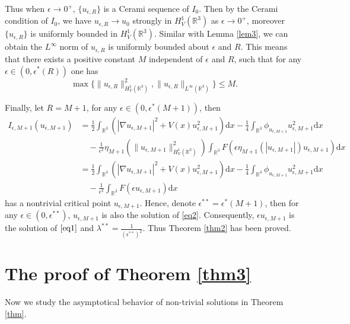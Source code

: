 \documentclass[12pt]{amsart}
\numberwithin{equation}{section}
\theoremstyle{definition}
\begin{document}
Thus when $\epsilon\to0^{+}$, $\{u_{\epsilon,R}\}$ is a Cerami sequence of $I_0$. Then by the Cerami condition of $I_0$, we have $u_{\epsilon,R}\to u_0$ strongly in $H^1_{V}(\mathbb{R}^3)$ as $\epsilon\to0^+$, moreover $\{u_{\epsilon,R}\}$ is uniformly bounded in $H^1_{V}(\mathbb{R}^3)$. Similar with Lemma \ref{lem3}, we can obtain the $L^{\infty}$ norm of $u_{\epsilon,R}$ is uniformly bounded about $\epsilon$ and $R$. This means that there exists a positive constant $M$ independent of $\epsilon$ and $R$, such that for any $\epsilon\in(0,\epsilon^{\ast}(R))$ one has
$$\max\{\|u_{\epsilon,R}\|^2_{H^1_{V}(\mathbb{R}^3)},\|u_{\epsilon,R}\|_{L^{\infty}(\mathbb{R}^3)}\}\leq M.$$

Finally, let $R=M+1$, for any $\epsilon\in(0,\epsilon^{\ast}(M+1))$, then
\begin{equation*}
\begin{split}
    I_{\epsilon,M+1}\left ( u_{\epsilon,M+1} \right )&=\frac{1}{2}\int_{\mathbb R^3}\left(|\nabla u_{\epsilon,M+1}|^2+V(x)u_{\epsilon,M+1}^2\right)\text{d}x-\frac{1}{4}\int_{\mathbb R^3}\phi_{u_{\epsilon,M+1}}u_{\epsilon,M+1}^2\text{d}x\\
    &\quad-\frac{1}{\epsilon^2}\eta _{M+1}\left (\|u_{\epsilon,M+1}\|^{2}_{H^1_{V}(\mathbb{R}^3)}\right )\int_{\mathbb{R}^{3}}F\left (\epsilon \eta _{M+1} \left ( \left | u_{\epsilon,M+1}\right |\right )u_{\epsilon,M+1}\right )\text{d}x\\
    &=\frac{1}{2}\int_{\mathbb{R}^3}\left(|\nabla u_{\epsilon,M+1}|^{2}+V(x)u_{\epsilon,M+1}^2\right)\text{d}x-\frac{1}{4}\int_{\mathbb{R}^{3}}\phi _{u_{\epsilon,M+1}}u_{\epsilon,M+1}^{2}\text{d}x\\
    &\quad-\frac{1}{\epsilon ^{2}}\int_{\mathbb{R}^{3}}F\left (\epsilon u_{\epsilon,M+1}\right )\text{d}x
    \end{split}
\end{equation*}
has a nontrivial critical point $u_{\epsilon,M+1}$.  Hence, denote $\epsilon^{**}=\epsilon^{\ast}(M+1)$, then for any $\epsilon\in(0,\epsilon^{**})$, $u_{\epsilon,M+1}$ is also the solution of \eqref{eq2}. Consequently, $\epsilon u_{\epsilon,M+1}$ is the solution of $\eqref{eq1}$ and $\lambda^{**}=\frac{1}{(\epsilon^{**})^{2}}$. Thus Theorem \ref{thm2} has been proved.

\section{The proof of Theorem \ref{thm3}}

Now we study the asymptotical behavior of non-trivial solutions in Theorem \ref{thm}.
\end{document}
